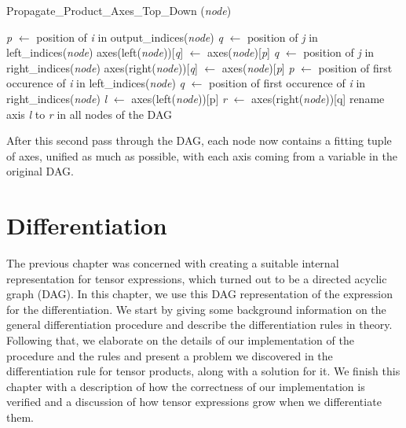 \documentclass[12pt, a4paper]{report}
\begin{document}
\begin{algorithm}[ht!]
    \caption{Propagate\_Product\_Axes\_Top\_Down (\textit{node})}
    \label{alg:product_axes_2}
    \begin{algorithmic}
            \State \textit{p} $\gets$ position of \textit{i} in output\_indices(\textit{node})
                \State \textit{q} $\gets$ position of \textit{j} in left\_indices(\textit{node})
                    \State axes(left(\textit{node}))[\textit{q}] $\gets$ axes(\textit{node})[\textit{p}]
                \EndIf
            \EndFor
                \State \textit{q} $\gets$ position of \textit{j} in right\_indices(\textit{node})
                    \State axes(right(\textit{node}))[\textit{q}] $\gets$ axes(\textit{node})[\textit{p}]
                \EndIf
            \EndFor
        \EndFor
         
            \State \textit{p} $\gets$ position of first occurence of \textit{i} in left\_indices(\textit{node})
                \State \textit{q} $\gets$ position of first occurence of \textit{i} in right\_indices(\textit{node})
                \State \textit{l} $\gets$ axes(left(\textit{node}))[p]
                \State \textit{r} $\gets$ axes(right(\textit{node}))[q]
                \State rename axis \textit{l} to \textit{r} in all nodes of the DAG
            \EndIf
        \EndFor
    \end{algorithmic}
\end{algorithm}

After this second pass through the DAG, each node now contains a fitting tuple of axes, unified as much as possible, with each axis coming from a variable in the original DAG.

\FloatBarrier
\chapter{Differentiation}
The previous chapter was concerned with creating a suitable internal representation for tensor expressions, which turned out to be a directed acyclic graph (DAG).
In this chapter, we use this DAG representation of the expression for the differentiation.
We start by giving some background information on the general differentiation procedure and describe the differentiation rules in theory.
Following that, we elaborate on the details of our implementation of the procedure and the rules and present a problem we discovered in the differentiation rule for tensor products, along with a solution for it.
We finish this chapter with a description of how the correctness of our implementation is verified and a discussion of how tensor expressions grow when we differentiate them.
\end{document}

